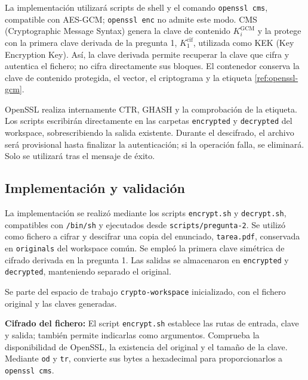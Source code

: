 La implementación utilizará scripts de shell y el comando \texttt{openssl cms}, compatible con AES-GCM; \texttt{openssl enc} no admite este modo. CMS (Cryptographic Message Syntax) genera la clave de contenido $K_i^{\mathrm{GCM}}$ y la protege con la primera clave derivada de la pregunta 1, $K_1^{\mathrm{cif}}$, utilizada como KEK (Key Encryption Key). Así, la clave derivada permite recuperar la clave que cifra y autentica el fichero; no cifra directamente sus bloques. El contenedor conserva la clave de contenido protegida, el vector, el criptograma y la etiqueta \ref{ref:openssl-gcm}.

OpenSSL realiza internamente CTR, GHASH y la comprobación de la etiqueta. Los scripts escribirán directamente en las carpetas \texttt{encrypted} y \texttt{decrypted} del workspace, sobrescribiendo la salida existente. Durante el descifrado, el archivo será provisional hasta finalizar la autenticación; si la operación falla, se eliminará. Solo se utilizará tras el mensaje de éxito.

\subsection{Implementación y validación}
La implementación se realizó mediante los scripts \texttt{encrypt.sh} y \texttt{decrypt.sh}, compatibles con \texttt{/bin/sh} y ejecutados desde \texttt{scripts/pregunta-2}. Se utilizó como fichero a cifrar y descifrar una copia del enunciado, \texttt{tarea.pdf}, conservada en \texttt{originals} del workspace común. Se empleó la primera clave simétrica de cifrado derivada en la pregunta 1. Las salidas se almacenaron en \texttt{encrypted} y \texttt{decrypted}, manteniendo separado el original.

Se parte del espacio de trabajo \texttt{crypto-workspace} inicializado, con el fichero original y las claves generadas.

\noindent\begin{minipage}{\linewidth}
\begingroup
\renewcommand{\lstlistingname}{Salida y verificación}

\endgroup
\end{minipage}

\textbf{Cifrado del fichero:} El script \texttt{encrypt.sh} establece las rutas de entrada, clave y salida; también permite indicarlas como argumentos. Comprueba la disponibilidad de OpenSSL, la existencia del original y el tamaño de la clave. Mediante \texttt{od} y \texttt{tr}, convierte sus bytes a hexadecimal para proporcionarlos a \texttt{openssl cms}.

